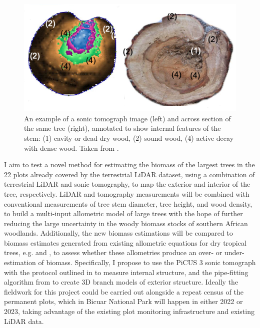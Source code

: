 \begin{refsection}
\begin{figure}
	\includegraphics[width=\linewidth]{img/tomograph}
	\caption[Example tomograph visualisation and trunk cross-section photograph]{An example of a sonic tomograph image (left) and across section of
		the same tree (right), annotated to show internal features of the stem:
		(1) cavity or dead dry wood, (2) sound wood, (4) active decay with dense
	wood. Taken from \citet{Picus2016}.}
	\label{legacy:tomograph}
\end{figure}

I aim to test a novel method for estimating the biomass of the largest trees in the 22 plots already covered by the terrestrial LiDAR dataset, using a combination of terrestrial LiDAR and sonic tomography, to map the exterior and interior of the tree, respectively. LiDAR and tomography measurements will be combined with conventional measurements of tree stem diameter, tree height, and wood density, to build a multi-input allometric model of large trees with the hope of further reducing the large uncertainty in the woody biomass stocks of southern African woodlands. Additionally, the new biomass estimations will be compared to biomass estimates generated from existing allometric equations for dry tropical trees, e.g. \citet{Chave2014} and \citet{Ryan2011}, to assess whether these allometries produce an over- or under-estimation of biomass. Specifically, I propose to use the PiCUS 3 sonic tomograph with the protocol outlined in \citet{Gilbert2016} to measure internal structure, and the pipe-fitting algorithm from \citet{Calders2014} to create 3D branch models of exterior structure. Ideally the fieldwork for this project could be carried out alongside a repeat census of the permanent plots, which in Bicuar National Park will happen in either 2022 or 2023, taking advantage of the existing plot monitoring infrastructure and existing LiDAR data.


\end{refsection}
